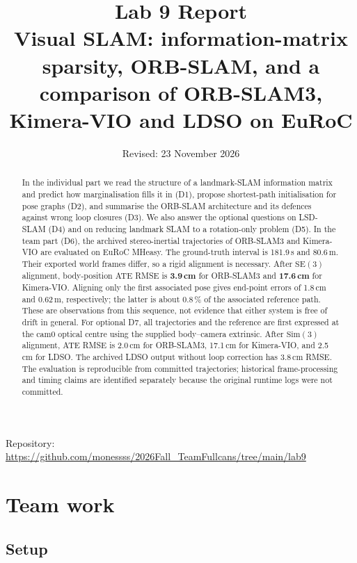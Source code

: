\documentclass[11pt,a4paper]{article}
\title{Lab 9 Report\\[0.3em]\large Visual SLAM: information-matrix sparsity, ORB-SLAM, and a
comparison of ORB-SLAM3, Kimera-VIO and LDSO on EuRoC}
\author{\studentname}
\date{Revised: 23 November 2026}
\DeclareRobustCommand{\code}[1]{\begingroup\ttfamily\codebreaks#1\endgroup}
\newcommand{\codebreaks}{\renewcommand{\_}{\textunderscore\allowbreak}}
\begin{document}
\maketitle
\noindent Repository: \url{https://github.com/monessss/2026Fall_TeamFullcans/tree/main/lab9}


\begin{abstract}
In the individual part we read the structure of a landmark-SLAM information matrix and
predict how marginalisation fills it in (D1), propose shortest-path initialisation for pose
graphs (D2), and summarise the ORB-SLAM architecture and its defences against wrong loop
closures (D3). We also answer the optional questions on LSD-SLAM (D4) and on reducing
landmark SLAM to a rotation-only problem (D5).
In the team part (D6), the archived stereo-inertial trajectories of ORB-SLAM3 and
Kimera-VIO are evaluated on EuRoC \code{MH\_01\_easy}. The ground-truth interval is
181.9\,s and 80.6\,m. Their exported world frames differ, so a rigid alignment is necessary.
After $\mathrm{SE}(3)$ alignment, body-position ATE RMSE is \textbf{3.9\,cm} for ORB-SLAM3
and \textbf{17.6\,cm} for Kimera-VIO. Aligning only the first associated pose gives
end-point errors of 1.8\,cm and 0.62\,m, respectively; the latter is about 0.8\,\% of
the associated reference path. These are observations from this sequence, not evidence
that either system is free of drift in general.
For optional D7, all trajectories and the reference are first expressed at the cam0
optical centre using the supplied body--camera extrinsic. After $\mathrm{Sim}(3)$ alignment,
ATE RMSE is 2.0\,cm for ORB-SLAM3, 17.1\,cm for Kimera-VIO, and 2.5\,cm for LDSO.
The archived LDSO output without loop correction has 3.8\,cm RMSE. The evaluation is
reproducible from committed trajectories; historical frame-processing and timing claims
are identified separately because the original runtime logs were not committed.
\end{abstract}



\section{Team work}\label{sec:team}

\subsection{Setup}\label{sec:setup}
\end{document}
